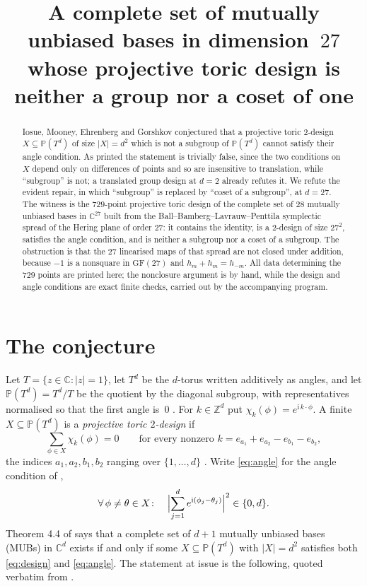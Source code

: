 \documentclass[11pt]{amsart}
\title[A non-group projective toric design of a complete MUB set]
{A complete set of mutually unbiased bases in dimension~$27$
 whose projective toric design is neither a group nor a coset of one}
\date{}
\theoremstyle{remark}
\newcommand{\GF}{\mathrm{GF}}
\begin{document}
\begin{abstract}
Iosue, Mooney, Ehrenberg and Gorshkov conjectured that a projective toric
$2$-design $X\subseteq\mathbb P(T^{d})$ of size $|X|=d^{2}$ which is not a
subgroup of $\mathbb P(T^{d})$ cannot satisfy their angle condition.
As printed the statement is trivially false, since
the two conditions on $X$ depend only on differences of points and so are
insensitive to translation, while ``subgroup'' is not; a translated group design
at $d=2$ already refutes it. We refute the evident repair, in which ``subgroup''
is replaced by ``coset of a subgroup'', at $d=27$. The witness is the $729$-point
projective toric design of the complete set of $28$ mutually unbiased bases in
$\mathbb C^{27}$ built from the Ball--Bamberg--Lavrauw--Penttila symplectic
spread of the Hering plane of order $27$: it contains the identity, is a
$2$-design of size $27^{2}$, satisfies the angle condition, and is neither a
subgroup nor a coset of a subgroup. The obstruction is that the $27$
linearised maps of that spread are not closed under addition, because $-1$ is a
nonsquare in $\GF(27)$ and $h_{m}+h_{m}=h_{-m}$. All data determining the $729$
points are printed here; the nonclosure argument is by hand, while the design and
angle conditions are exact finite checks, carried out by the accompanying
program.
\end{abstract}

\maketitle

\section{The conjecture}\label{sec:conj}

Let $T=\{z\in\mathbb C:|z|=1\}$, let $T^{d}$ be the $d$-torus written additively
as angles, and let $\mathbb P(T^{d})=T^{d}/T$ be the quotient by the diagonal
subgroup, with representatives normalised so that the first angle is~$0$
\cite[Definition 2.4]{IMEG}. For $k\in\mathbb Z^{d}$ put
$\chi_{k}(\phi)=e^{\mathrm i\,k\cdot\phi}$. A finite $X\subseteq\mathbb P(T^{d})$
is a \emph{projective toric $2$-design} if
\begin{equation}\label{eq:design}
  \sum_{\phi\in X}\chi_{k}(\phi)=0
  \qquad\text{for every nonzero }
  k=e_{a_{1}}+e_{a_{2}}-e_{b_{1}}-e_{b_{2}},
\end{equation}
the indices $a_{1},a_{2},b_{1},b_{2}$ ranging over $\{1,\dots,d\}$
\cite[Definition 2.6]{IMEG}. Write \eqref{eq:angle} for the angle condition of
\cite[Theorem 4.4]{IMEG},
\begin{equation}\label{eq:angle}
  \forall\,\phi\neq\theta\in X\colon\quad
  \Bigl|\sum_{j=1}^{d}e^{\mathrm i(\phi_{j}-\theta_{j})}\Bigr|^{2}\in\{0,d\}.
\end{equation}
Theorem 4.4 of \cite{IMEG} says that a complete set of $d+1$ mutually unbiased
bases (MUBs) in $\mathbb C^{d}$ exists if and only if some
$X\subseteq\mathbb P(T^{d})$ with $|X|=d^{2}$ satisfies both \eqref{eq:design}
and \eqref{eq:angle}. The statement at issue is the following, quoted verbatim
from \cite{IMEG}.
\end{document}
